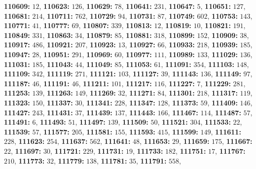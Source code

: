\textsf{\bfseries 110609:} $12$, \textsf{\bfseries 110623:} $126$, \textsf{\bfseries 110629:} $78$, \textsf{\bfseries 110641:} $231$, \textsf{\bfseries 110647:} $5$, \textsf{\bfseries 110651:} $127$, \textsf{\bfseries 110681:} $214$, \textsf{\bfseries 110711:} $762$, \textsf{\bfseries 110729:} $94$, \textsf{\bfseries 110731:} $87$, \textsf{\bfseries 110749:} $602$, \textsf{\bfseries 110753:} $143$, \textsf{\bfseries 110771:} $41$, \textsf{\bfseries 110777:} $69$, \textsf{\bfseries 110807:} $339$, \textsf{\bfseries 110813:} $12$, \textsf{\bfseries 110819:} $10$, \textsf{\bfseries 110821:} $191$, \textsf{\bfseries 110849:} $331$, \textsf{\bfseries 110863:} $34$, \textsf{\bfseries 110879:} $85$, \textsf{\bfseries 110881:} $318$, \textsf{\bfseries 110899:} $152$, \textsf{\bfseries 110909:} $38$, \textsf{\bfseries 110917:} $486$, \textsf{\bfseries 110921:} $207$, \textsf{\bfseries 110923:} $13$, \textsf{\bfseries 110927:} $66$, \textsf{\bfseries 110933:} $218$, \textsf{\bfseries 110939:} $185$, \textsf{\bfseries 110947:} $28$, \textsf{\bfseries 110951:} $291$, \textsf{\bfseries 110969:} $60$, \textsf{\bfseries 110977:} $111$, \textsf{\bfseries 110989:} $133$, \textsf{\bfseries 111029:} $136$, \textsf{\bfseries 111031:} $185$, \textsf{\bfseries 111043:} $44$, \textsf{\bfseries 111049:} $85$, \textsf{\bfseries 111053:} $61$, \textsf{\bfseries 111091:} $354$, \textsf{\bfseries 111103:} $148$, \textsf{\bfseries 111109:} $342$, \textsf{\bfseries 111119:} $271$, \textsf{\bfseries 111121:} $103$, \textsf{\bfseries 111127:} $39$, \textsf{\bfseries 111143:} $136$, \textsf{\bfseries 111149:} $97$, \textsf{\bfseries 111187:} $46$, \textsf{\bfseries 111191:} $46$, \textsf{\bfseries 111211:} $101$, \textsf{\bfseries 111217:} $116$, \textsf{\bfseries 111227:} $7$, \textsf{\bfseries 111229:} $281$, \textsf{\bfseries 111253:} $139$, \textsf{\bfseries 111263:} $149$, \textsf{\bfseries 111269:} $32$, \textsf{\bfseries 111271:} $84$, \textsf{\bfseries 111301:} $218$, \textsf{\bfseries 111317:} $119$, \textsf{\bfseries 111323:} $150$, \textsf{\bfseries 111337:} $30$, \textsf{\bfseries 111341:} $228$, \textsf{\bfseries 111347:} $128$, \textsf{\bfseries 111373:} $59$, \textsf{\bfseries 111409:} $146$, \textsf{\bfseries 111427:} $243$, \textsf{\bfseries 111431:} $37$, \textsf{\bfseries 111439:} $137$, \textsf{\bfseries 111443:} $166$, \textsf{\bfseries 111467:} $114$, \textsf{\bfseries 111487:} $57$, \textsf{\bfseries 111491:} $6$, \textsf{\bfseries 111493:} $51$, \textsf{\bfseries 111497:} $139$, \textsf{\bfseries 111509:} $50$, \textsf{\bfseries 111521:} $304$, \textsf{\bfseries 111533:} $22$, \textsf{\bfseries 111539:} $57$, \textsf{\bfseries 111577:} $205$, \textsf{\bfseries 111581:} $155$, \textsf{\bfseries 111593:} $415$, \textsf{\bfseries 111599:} $149$, \textsf{\bfseries 111611:} $228$, \textsf{\bfseries 111623:} $254$, \textsf{\bfseries 111637:} $562$, \textsf{\bfseries 111641:} $48$, \textsf{\bfseries 111653:} $29$, \textsf{\bfseries 111659:} $175$, \textsf{\bfseries 111667:} $22$, \textsf{\bfseries 111697:} $30$, \textsf{\bfseries 111721:} $229$, \textsf{\bfseries 111731:} $19$, \textsf{\bfseries 111733:} $182$, \textsf{\bfseries 111751:} $17$, \textsf{\bfseries 111767:} $210$, \textsf{\bfseries 111773:} $32$, \textsf{\bfseries 111779:} $138$, \textsf{\bfseries 111781:} $35$, \textsf{\bfseries 111791:} $558$, 
